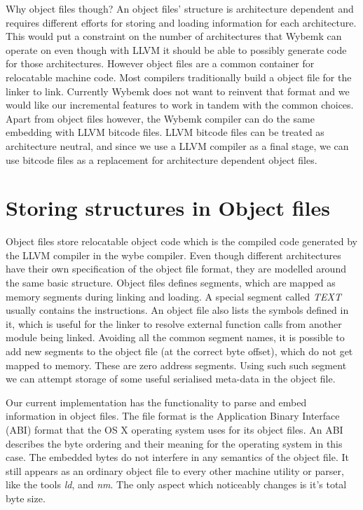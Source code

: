 Why object files though? An object files' structure is architecture dependent
and requires different efforts for storing and loading information for each
architecture. This would put a constraint on the number of architectures that
Wybemk can operate on even though with LLVM it should be able to possibly
generate code for those architectures. However object files are a common
container for relocatable machine code. Most compilers traditionally build a
object file for the linker to link. Currently Wybemk does not want to reinvent
that format and we would like our incremental features to work in tandem with
the common choices. Apart from object files however, the Wybemk compiler can do
the same embedding with LLVM bitcode files. LLVM bitcode files can be treated
as architecture neutral, and since we use a LLVM compiler as a final stage, we
can use bitcode files as a replacement for architecture dependent object files.


\section{Storing structures in Object files}

Object files store relocatable object code which is the compiled code generated
by the LLVM compiler in the wybe compiler. Even though different architectures
have their own specification of the object file format, they are modelled
around the same basic structure. Object files defines segments, which are
mapped as memory segments during linking and loading. A special segment called
\textit{TEXT} usually contains the instructions. An object file also lists the
symbols defined in it, which is useful for the linker to resolve external
function calls from another module being linked. Avoiding all the common
segment names, it is possible to add new segments to the object file (at the
correct byte offset), which do not get mapped to memory. These are zero address
segments. Using such such segment we can attempt storage of some useful
serialised meta-data in the object file. 

Our current implementation has the functionality to parse and embed information
in \macho object files. The \macho file format is the Application Binary
Interface (ABI) format that the OS X operating system uses for its object
files. An ABI describes the byte ordering and their meaning for the operating
system in this case. The embedded bytes do not interfere in any semantics of
the object file. It still appears as an ordinary object file to every other
machine utility or parser, like the tools \textit{ld}, and \textit{nm}. The
only aspect which noticeably changes is it's total byte size.


